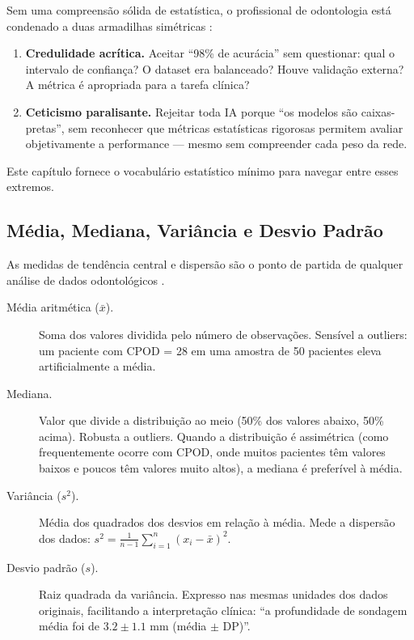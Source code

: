 Sem uma compreensão sólida de estatística, o profissional de odontologia está condenado a duas armadilhas simétricas :

\begin{enumerate}
    \item \textbf{Credulidade acrítica.} Aceitar ``98\% de acurácia'' sem questionar: qual o intervalo de confiança? O dataset era balanceado? Houve validação externa? A métrica é apropriada para a tarefa clínica?
    \item \textbf{Ceticismo paralisante.} Rejeitar toda IA porque ``os modelos são caixas-pretas'', sem reconhecer que métricas estatísticas rigorosas permitem avaliar objetivamente a performance — mesmo sem compreender cada peso da rede.
\end{enumerate}

Este capítulo fornece o vocabulário estatístico mínimo para navegar entre esses extremos.

\subsection{Média, Mediana, Variância e Desvio Padrão}

As medidas de tendência central e dispersão são o ponto de partida de qualquer análise de dados odontológicos .

\begin{description}
    \item[Média aritmética ($\bar{x}$).] Soma dos valores dividida pelo número de observações. Sensível a outliers: um paciente com CPOD = 28 em uma amostra de 50 pacientes eleva artificialmente a média.
    
    \item[Mediana.] Valor que divide a distribuição ao meio (50\% dos valores abaixo, 50\% acima). Robusta a outliers. Quando a distribuição é assimétrica (como frequentemente ocorre com CPOD, onde muitos pacientes têm valores baixos e poucos têm valores muito altos), a mediana é preferível à média.
    
    \item[Variância ($s^2$).] Média dos quadrados dos desvios em relação à média. Mede a dispersão dos dados: $s^2 = \frac{1}{n-1}\sum_{i=1}^{n}(x_i - \bar{x})^2$.
    
    \item[Desvio padrão ($s$).] Raiz quadrada da variância. Expresso nas mesmas unidades dos dados originais, facilitando a interpretação clínica: ``a profundidade de sondagem média foi de $3.2 \pm 1.1$ mm (média $\pm$ DP)''.
\end{description}

